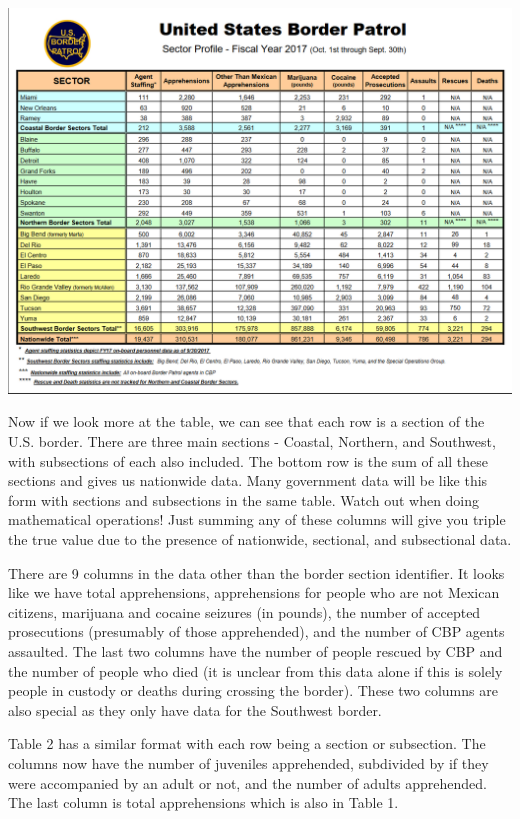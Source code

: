 \documentclass[
  12pt,
]{book}
\begin{document}
\includegraphics{images/pdf_table_1.PNG}

Now if we look more at the table, we can see that each row is a section of the U.S. border. There are three main sections - Coastal, Northern, and Southwest, with subsections of each also included. The bottom row is the sum of all these sections and gives us nationwide data. Many government data will be like this form with sections and subsections in the same table. Watch out when doing mathematical operations! Just summing any of these columns will give you triple the true value due to the presence of nationwide, sectional, and subsectional data.

There are 9 columns in the data other than the border section identifier. It looks like we have total apprehensions, apprehensions for people who are not Mexican citizens, marijuana and cocaine seizures (in pounds), the number of accepted prosecutions (presumably of those apprehended), and the number of CBP agents assaulted. The last two columns have the number of people rescued by CBP and the number of people who died (it is unclear from this data alone if this is solely people in custody or deaths during crossing the border). These two columns are also special as they only have data for the Southwest border.

Table 2 has a similar format with each row being a section or subsection. The columns now have the number of juveniles apprehended, subdivided by if they were accompanied by an adult or not, and the number of adults apprehended. The last column is total apprehensions which is also in Table 1.
\end{document}
